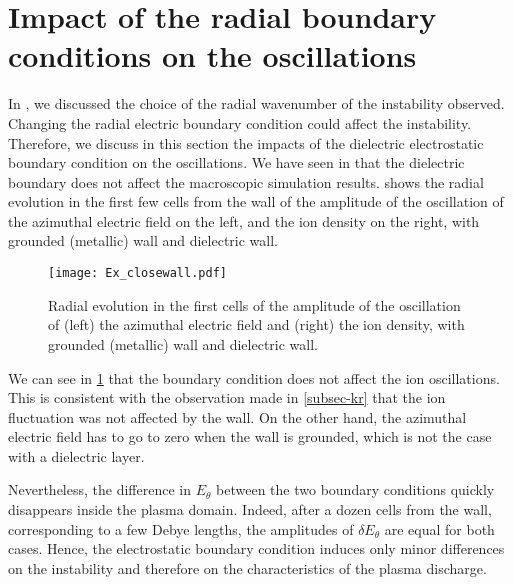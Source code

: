 
\section{Impact of the radial boundary conditions on the oscillations}
  \label{subsec-BC}

  In , we discussed the choice of the radial wavenumber of the instability observed.
  Changing the radial electric boundary condition could affect the instability.
  Therefore, we discuss in this section  the impacts of the dielectric electrostatic boundary condition on the oscillations.
  We have seen in  that the dielectric boundary does not affect the macroscopic simulation results.
   shows the radial evolution in the first few cells from the wall of the amplitude of the oscillation of the azimuthal electric field on the left, and the ion density on the right, with grounded (metallic) wall and dielectric wall.
  
  \begin{figure}[!hbt]
    \centering
    \texttt{[image: Ex\_closewall.pdf]}
    \caption{Radial evolution in the first cells of the amplitude of the oscillation of (left) the azimuthal electric field and (right) the ion density, with grounded (metallic) wall and dielectric wall.}
    \label{fig-closswallosci}
  \end{figure}
  
  We can see in \cref{fig-closswallosci} that the boundary condition does not affect the ion oscillations.
  This is consistent with the observation made in \cref{subsec-kr} that the ion fluctuation was not affected by the wall.
  On the other hand, the azimuthal electric field has to go to zero when the wall is grounded, which is not the case with a dielectric layer.
  
  Nevertheless, the difference in $E_{\theta}$ between the two boundary conditions quickly disappears inside the plasma domain.
  Indeed, after a dozen cells from the wall, corresponding to a few Debye lengths, the amplitudes of $\delta E_{\theta}$ are equal for both cases.
  Hence, the electrostatic boundary condition induces only minor differences on the instability and therefore on the characteristics of  the plasma discharge.
  
  